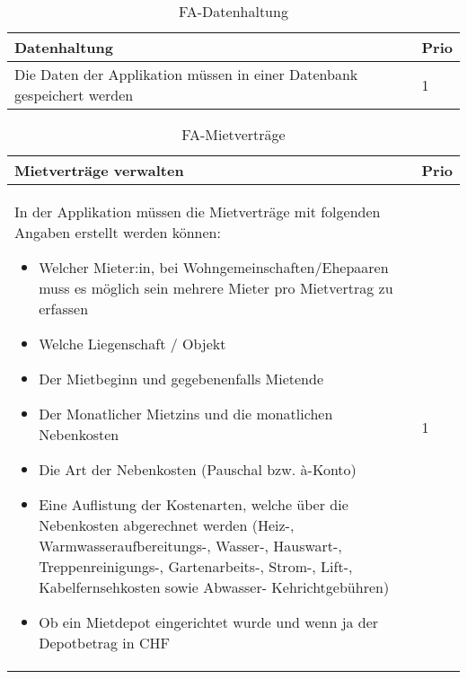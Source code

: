 \begin{table}[H]
  \centering
  \settowidth{}
  \setlength\extrarowheight{2pt}
  \begin{tabulary}{1.0\textwidth}{|m{16cm}|L|}
    \hline
    \textbf{Datenhaltung}&\textbf{Prio}\\
    \hline
      Die Daten der Applikation müssen in einer Datenbank gespeichert werden & 1\\
    \hline
  \end{tabulary}
  \caption{FA-Datenhaltung}
  \label{faDatenhaltung}
\end{table}

\begin{table}[H]
  \centering
  \settowidth{}
  \setlength\extrarowheight{2pt}
  \begin{tabulary}{1.0\textwidth}{|m{16cm}|L|}
    \hline
    \textbf{Mietverträge verwalten}&\textbf{Prio}\\
    \hline
    In der Applikation müssen die Mietverträge mit folgenden Angaben erstellt werden können:
    \begin{itemize}
      \item Welcher Mieter:in, bei Wohngemeinschaften/Ehepaaren muss es möglich sein mehrere Mieter pro Mietvertrag zu erfassen
      \item Welche Liegenschaft / Objekt
      \item Der Mietbeginn und gegebenenfalls Mietende
      \item Der Monatlicher Mietzins und die monatlichen Nebenkosten
      \item Die Art der Nebenkosten (Pauschal bzw. à-Konto)
      \item Eine Auflistung der Kostenarten, welche über die Nebenkosten abgerechnet werden (Heiz-, Warmwasseraufbereitungs-, Wasser-, Hauswart-, Treppenreinigungs-, Gartenarbeits-, Strom-, Lift-, Kabelfernsehkosten sowie Abwasser- Kehrichtgebühren)
      \item Ob ein Mietdepot eingerichtet wurde und wenn ja der Depotbetrag in CHF
    \end{itemize}  & 1\\ 
    \hline
  \end{tabulary}
  \caption{FA-Mietverträge}
  \label{faMietverträge}
\end{table}

